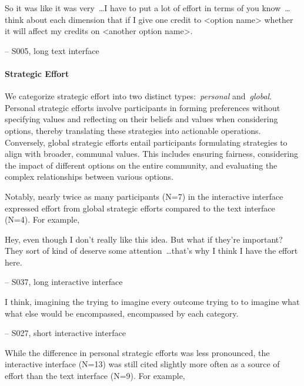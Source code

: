 \begin{displayquote}
So it was like it was very~\ldots I have to put a lot of effort in terms of you know~\ldots think about each dimension that if I give one credit to <option name> whether it will affect my credits on <another option name>.

\noindent \hfill -- S005, long text interface
\end{displayquote}

\paragraph{Strategic Effort}
We categorize strategic effort into two distinct types:~\textit{personal} and~\textit{global}. Personal strategic efforts involve participants in forming preferences without specifying values and reflecting on their beliefs and values when considering options, thereby translating these strategies into actionable operations. Conversely, global strategic efforts entail participants formulating strategies to align with broader, communal values. This includes ensuring fairness, considering the impact of different options on the entire community, and evaluating the complex relationships between various options.

Notably, nearly twice as many participants (N=7) in the interactive interface expressed effort from global strategic efforts compared to the text interface (N=4). For example,

\begin{displayquote}
Hey, even though I don't really like this idea. But what if they're important? They sort of kind of deserve some attention~\ldots that's why I think I have the effort here.

\noindent \hfill -- S037, long interactive interface
\end{displayquote}

\begin{displayquote}
I think, imagining the trying to imagine every outcome trying to to imagine what what else would be encompassed, encompassed by each category.

\noindent \hfill -- S027, short interactive interface
\end{displayquote}

While the difference in personal strategic efforts was less pronounced, the interactive interface (N=13) was still cited slightly more often as a source of effort than the text interface (N=9). For example,

